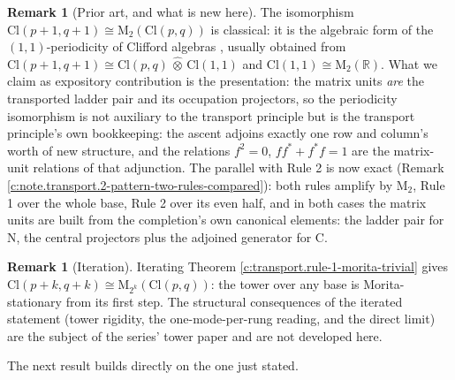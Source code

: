 \documentclass[11pt]{article}
\theoremstyle{definition}
\newtheorem{remark}[theorem]{Remark}
\theoremstyle{plain}
\providecommand{\Cl}{}\renewcommand{\Cl}{\mathrm{Cl}}
\providecommand{\Mat}{}\renewcommand{\Mat}{\mathrm{M}}
\providecommand{\R}{}\renewcommand{\R}{\mathbb{R}}
\begin{document}
\begin{remark}[Prior art, and what is new here]\label{c:note.transport.prior-art-what-new-here}
The isomorphism $\Cl(p{+}1,q{+}1) \cong \Mat_2(\Cl(p,q))$ is classical: it is the algebraic form of the $(1,1)$-periodicity of Clifford algebras \cite{ABS1964, Porteous1995, Lounesto2001}, usually obtained from $\Cl(p{+}1,q{+}1) \cong \Cl(p,q)\,\hat{\otimes}\,\Cl(1,1)$ and $\Cl(1,1) \cong \Mat_2(\R)$. What we claim as expository contribution is the presentation: the matrix units \emph{are} the transported ladder pair and its occupation projectors, so the periodicity isomorphism is not auxiliary to the transport principle but is the transport principle's own bookkeeping: the ascent adjoins exactly one row and column's worth of new structure, and the relations $f^2 = 0$, $ff^* + f^*f = 1$ are the matrix-unit relations of that adjunction. The parallel with Rule 2 is now exact (Remark \ref{c:note.transport.2-pattern-two-rules-compared}): both rules amplify by $\Mat_2$, Rule 1 over the whole base, Rule 2 over its even half, and in both cases the matrix units are built from the completion's own canonical elements: the ladder pair for N, the central projectors plus the adjoined generator for C.
\end{remark}

\begin{remark}[Iteration]\label{c:note.transport.iteration}
Iterating Theorem \ref{c:transport.rule-1-morita-trivial} gives $\Cl(p{+}k, q{+}k) \cong \Mat_{2^k}(\Cl(p,q))$: the tower over any base is Morita-stationary from its first step. The structural consequences of the iterated statement (tower rigidity, the one-mode-per-rung reading, and the direct limit) are the subject of the series' tower paper \cite{ButlerT3} and are not developed here.
\end{remark}

The next result builds directly on the one just stated.
\end{document}

